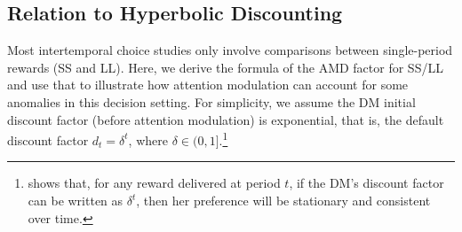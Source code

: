 \documentclass[
  12pt,
]{article}
\begin{document}
\hypertarget{relation-to-hyperbolic-discounting}{%
\subsection{\texorpdfstring{Relation to Hyperbolic Discounting
\label{hyperbolic}}{Relation to Hyperbolic Discounting }}\label{relation-to-hyperbolic-discounting}}

Most intertemporal choice studies only involve comparisons between
single-period rewards (SS and LL). Here, we derive the formula of the
AMD factor for SS/LL and use that to illustrate how attention modulation
can account for some anomalies in this decision setting. For simplicity,
we assume the DM initial discount factor (before attention modulation)
is exponential, that is, the default discount factor \(d_t = \delta^t\),
where \(\delta\in(0,1]\).\footnote{\citet{strotz1955myopia} shows that,
  for any reward delivered at period \(t\), if the DM's discount factor
  can be written as \(\delta^t\), then her preference will be stationary
  and consistent over time.}
\end{document}
